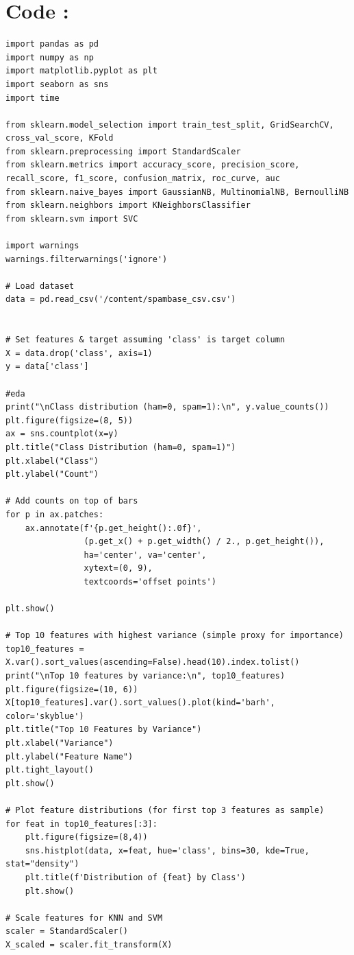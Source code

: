 \documentclass[12pt]{article}
\begin{document}
\section*{Code : }
\begin{verbatim}
import pandas as pd
import numpy as np
import matplotlib.pyplot as plt
import seaborn as sns
import time

from sklearn.model_selection import train_test_split, GridSearchCV, cross_val_score, KFold
from sklearn.preprocessing import StandardScaler
from sklearn.metrics import accuracy_score, precision_score, recall_score, f1_score, confusion_matrix, roc_curve, auc
from sklearn.naive_bayes import GaussianNB, MultinomialNB, BernoulliNB
from sklearn.neighbors import KNeighborsClassifier
from sklearn.svm import SVC

import warnings
warnings.filterwarnings('ignore')

# Load dataset
data = pd.read_csv('/content/spambase_csv.csv')


# Set features & target assuming 'class' is target column
X = data.drop('class', axis=1)
y = data['class']

#eda
print("\nClass distribution (ham=0, spam=1):\n", y.value_counts())
plt.figure(figsize=(8, 5))
ax = sns.countplot(x=y)
plt.title("Class Distribution (ham=0, spam=1)")
plt.xlabel("Class")
plt.ylabel("Count")

# Add counts on top of bars
for p in ax.patches:
    ax.annotate(f'{p.get_height():.0f}', 
                (p.get_x() + p.get_width() / 2., p.get_height()), 
                ha='center', va='center', 
                xytext=(0, 9), 
                textcoords='offset points')

plt.show()

# Top 10 features with highest variance (simple proxy for importance)
top10_features = X.var().sort_values(ascending=False).head(10).index.tolist()
print("\nTop 10 features by variance:\n", top10_features)
plt.figure(figsize=(10, 6))
X[top10_features].var().sort_values().plot(kind='barh', color='skyblue')
plt.title("Top 10 Features by Variance")
plt.xlabel("Variance")
plt.ylabel("Feature Name")
plt.tight_layout()
plt.show()

# Plot feature distributions (for first top 3 features as sample)
for feat in top10_features[:3]:
    plt.figure(figsize=(8,4))
    sns.histplot(data, x=feat, hue='class', bins=30, kde=True, stat="density")
    plt.title(f'Distribution of {feat} by Class')
    plt.show()

# Scale features for KNN and SVM
scaler = StandardScaler()
X_scaled = scaler.fit_transform(X)


\end{verbatim}
\end{document}
